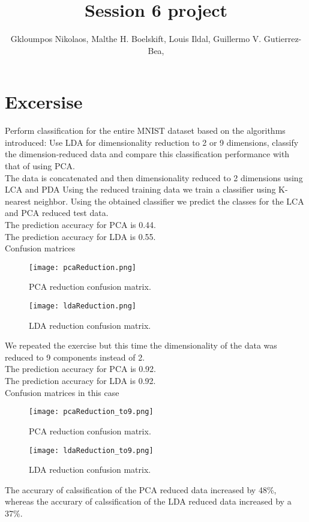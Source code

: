 \documentclass{article}
\title{Session 6 project}
\author {
      Gkloumpos Nikolaos,
      Malthe H. Boelskift,
      Louis Ildal,
      Guillermo V. Gutierrez-Bea,
}
\begin{document}
\maketitle



\section{Excersise}
Perform classification for the entire MNIST dataset based on the algorithms introduced: 
Use LDA for dimensionality reduction to 2 or 9 dimensions, classify the dimension-reduced data and compare this classification performance with that of using PCA.
\\
The data is concatenated and then dimensionality reduced to 2 dimensions using LCA and PDA
Using the reduced training data we train a classifier using K-nearest neighbor.
Using the obtained classifier we predict the classes for the LCA and PCA reduced test data.
\\
The prediction accuracy for PCA is 0.44.
\\
The prediction accuracy for LDA is 0.55.
\\
Confusion matrices
\begin{figure}[h]
      \caption{PCA reduction confusion matrix.}
      \centering
      \texttt{[image: pcaReduction.png]}
\end{figure}   

\begin{figure}[h]
      \caption{LDA reduction confusion matrix.}
      \centering
      \texttt{[image: ldaReduction.png]}
\end{figure}   

We repeated the exercise but this time the dimensionality of the data was reduced to 9 components instead of 2.
\\
The prediction accuracy for PCA is 0.92.
\\
The prediction accuracy for LDA is 0.92.
\\
Confusion matrices in this case
\begin{figure}[h]
      \caption{PCA reduction confusion matrix.}
      \centering
      \texttt{[image: pcaReduction\_to9.png]}
\end{figure}   

\begin{figure}[h]
      \caption{LDA reduction confusion matrix.}
      \centering
      \texttt{[image: ldaReduction\_to9.png]}
\end{figure}   
The accurary of calssification of the PCA reduced data increased by 48\%, whereas the accurary of calssification of the LDA reduced data increased by a 37\%.  


\end{document}
